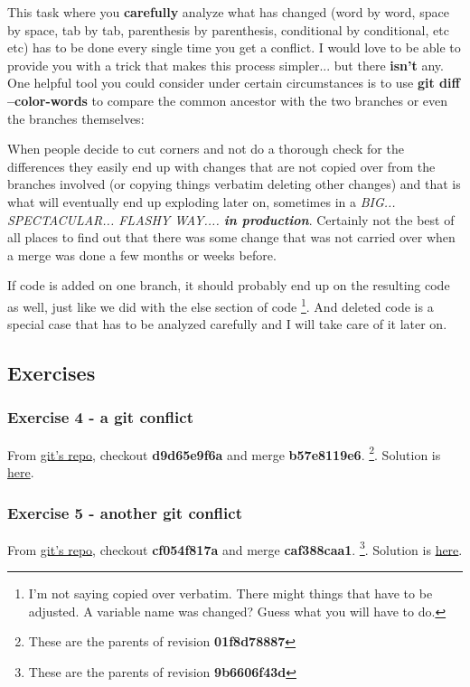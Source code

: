 This task where you {\bf carefully} analyze what has changed (word by word, space by space, tab by tab, parenthesis by parenthesis,
conditional by conditional, etc etc) has to be done every single time you get a conflict. I would love to be able to provide you with
a trick that makes this process simpler... but there {\bf isn't} any. One helpful tool you could consider under certain circumstances is to
use {\bf git diff --color-words} to compare the common ancestor with the two branches or even the branches themselves:


When people decide to cut corners and not do a thorough check for the differences they easily end up with changes that are
not copied over from the branches involved (or copying things verbatim deleting other changes) and that is what will
eventually end up exploding later on, sometimes in a {\it BIG... SPECTACULAR... FLASHY WAY.... {\bf in production}}. Certainly not
the best of all places to find out that there was some change that was not carried over when a merge was done a few
months or weeks before.

If code is added on one branch, it should probably end up on the resulting code as well, just like we did with the else section of
code \footnote{I'm not saying copied over verbatim. There might things that have to be adjusted. A variable name was changed? Guess
what you will have to do.}. And deleted code is a special case that has to be analyzed carefully and I will take care of it later on.

\subsection{Exercises}
\subsubsection{Exercise 4 - a git conflict}
From \hyperref[git_repo]{git's repo}, checkout {\bf d9d65e9f6a} and merge {\bf b57e8119e6}.
\footnote{These are the parents of revision {\bf 01f8d78887}}. Solution is \hyperref[exercise_04]{here}.

\subsubsection{Exercise 5 - another git conflict}
From \hyperref[git_repo]{git's repo}, checkout {\bf cf054f817a} and merge {\bf caf388caa1}.
\footnote{These are the parents of revision {\bf 9b6606f43d}}. Solution is \hyperref[exercise_05]{here}.
